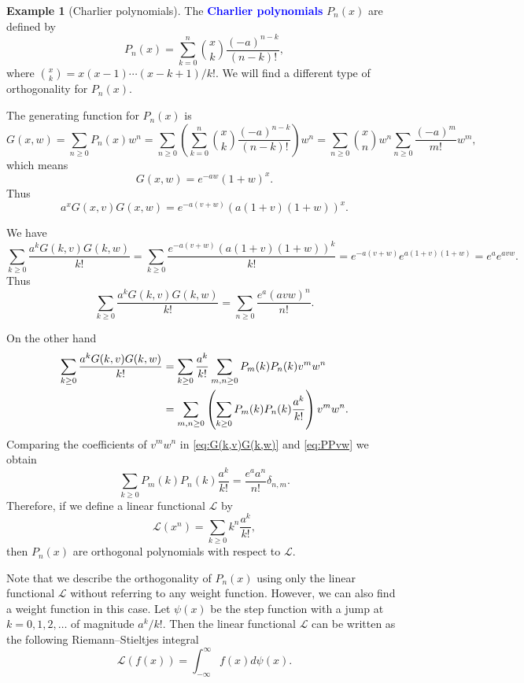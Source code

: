 \documentclass{amsart}
\numberwithin{equation}{section}
\theoremstyle{definition}
\newtheorem{exam}[thm]{Example}
\newcommand\LL{\mathcal{L}}
\renewcommand\emph[1]{\textcolor{blue}{\bf #1}}
\begin{document}
\begin{exam}[Charlier polynomials]
  The \emph{Charlier polynomials} \( P_n(x) \) are defined by
  \[
    P_n(x) = \sum_{k=0}^{n} \binom{x}{k} \frac{(-a)^{n-k}}{(n-k)!},
  \]
  where \( \binom{x}{k} = x(x-1)\cdots(x-k+1)/k! \).
  We will find a different type of orthogonality for \( P_n(x) \).

  The generating function for \( P_n(x) \) is
  \[
    G(x,w) = \sum_{n\ge0} P_n(x) w^n
    = \sum_{n\ge0} \left( \sum_{k=0}^{n} \binom{x}{k} \frac{(-a)^{n-k}}{(n-k)!} \right) w^n
    = \sum_{n\ge0} \binom{x}{n} w^n \sum_{n\ge 0} \frac{(-a)^m}{m!} w^m,
  \]
  which means
  \[
    G(x,w) =  e^{-aw}(1+w)^x .
  \]
  Thus
  \[
    a^x G(x,v) G(x,w) = e^{-a(v+w)} \left( a(1+v)(1+w) \right)^x .
  \]

  We have
  \[
    \sum_{k\ge 0} \frac{a^k G(k,v)G(k,w)}{k!}
    = \sum_{k\ge 0} \frac{e^{-a(v+w)} \left( a(1+v)(1+w) \right)^k}{k!} 
    = e^{-a(v+w)} e^{a(1+v)(1+w)} = e^ae^{avw}.
  \]
  Thus
  \begin{equation}\label{eq:G(k,v)G(k,w)}
    \sum_{k\ge 0} \frac{a^k G(k,v)G(k,w)}{k!}
    = \sum_{n\ge 0} \frac{e^a (avw)^n}{n!}.
  \end{equation}

On the other hand
\begin{align}
  \notag
    \sum_{k\ge 0} \frac{a^k G(k,v)G(k,w)}{k!}
    &= \sum_{k\ge 0} \frac{a^k}{k!} \sum_{m,n\ge0} P_m(k) P_n(k) v^m w^n\\
  \label{eq:PPvw}
    &= \sum_{m,n\ge0} \left( \sum_{k\ge 0}  P_m(k) P_n(k) \frac{a^k}{k!} \right)v^m w^n.
\end{align}
Comparing the coefficients of \( v^mw^n \) in \eqref{eq:G(k,v)G(k,w)} and \eqref{eq:PPvw} we obtain
\begin{equation}\label{eq:charlier-orthogonality}
  \sum_{k\ge 0}  P_m(k) P_n(k) \frac{a^k}{k!} = \frac{e^a a^n}{n!} \delta_{n,m}.
\end{equation}
Therefore, if we define a linear functional \( \LL \) by
\[
 \LL(x^n)  = \sum_{k\ge 0} k^n \frac{a^k}{k!},
\]
then \( P_n(x) \) are orthogonal polynomials with respect to \( \LL \).

Note that we describe the orthogonality of \( P_n(x) \) using only the
linear functional \( \LL \) without referring to any weight function.
However, we can also find a weight function in this case. Let
\( \psi(x) \) be the step function with a jump at \( k=0,1,2,\ldots \) of
magnitude \( a^k/k! \).
Then the linear functional \( \LL \) can be written as the following
Riemann--Stieltjes integral
\[
  \LL(f(x)) = \int_{-\infty}^\infty f(x) d \psi(x).
\]
\end{exam}
\end{document}
